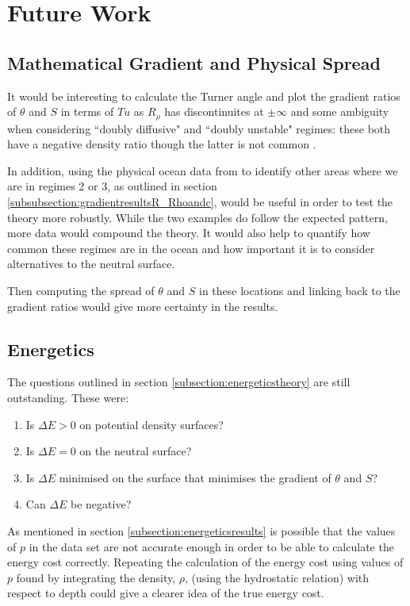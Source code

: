 \section{Future Work}

\subsection{Mathematical Gradient and Physical Spread}

It would be interesting to calculate the Turner angle and plot the gradient ratios of $\theta$ and $S$ in terms of $Tu$  as $R_\rho$ has discontinuites at $\pm\infty$ and some ambiguity when considering ``doubly diffusive" and ``doubly unstable" regimes: these both have a negative density ratio though the latter is not common \citep{YOU2002}.   

In addition, using the physical ocean data from \citet{WOCE2002} to identify other areas where we are in regimes 2 or 3, as outlined in section \ref{subsubsection:gradientresultsR_Rhoandc}, would be useful in order to test the theory more robustly. While the two examples do follow the expected pattern, more data would compound the theory. It would also help to quantify how common these regimes are in the ocean and how important it is to consider alternatives to the neutral surface. 

Then computing the spread of $\theta$ and $S$ in these locations and linking back to the gradient ratios would give more certainty in the results.

\subsection{Energetics}

The questions outlined in section \ref{subsection:energeticstheory} are still outstanding. These were:

\begin{enumerate}
    \item Is $\Delta E>0$ on potential density surfaces?
    \item Is $\Delta E = 0$ on the neutral surface?
    \item Is $\Delta E$ minimised on the surface that minimises the gradient of $\theta$ and $S$?
    \item Can $\Delta E$ be negative?
\end{enumerate}

As mentioned in section \ref{subsection:energeticsresults} is possible that the values of $p$ in the \citet{WOCE2002} data set are not accurate enough in order to be able to calculate the energy cost correctly. Repeating the calculation of the energy cost using values of $p$ found by integrating the density, $\rho$, (using the hydrostatic relation) with respect to depth could give a clearer idea of the true energy cost. 

